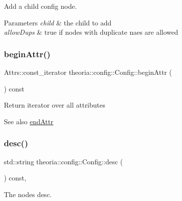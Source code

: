 Add a child config node. 
\begin{DoxyParams}{Parameters}
{\em child} & the child to add \\
\hline
{\em allow\+Dups} & true if nodes with duplicate naes are allowed \\
\hline
\end{DoxyParams}
\mbox{\label{classtheoria_1_1config_1_1Config_a4bd7712d99a507b1da47da9257094051}} 
\subsubsection{\texorpdfstring{begin\+Attr()}{beginAttr()}}
{\footnotesize\ttfamily Attrs\+::const\+\_\+iterator theoria\+::config\+::\+Config\+::begin\+Attr (\begin{DoxyParamCaption}{ }\end{DoxyParamCaption}) const\hspace{0.3cm}{\ttfamily [inline]}}

Return iterator over all attributes \begin{DoxySeeAlso}{See also}
\hyperlink{classtheoria_1_1config_1_1Config_a3d4ea72c3b43c8674456fdc263d39e39}{end\+Attr} 
\end{DoxySeeAlso}
\mbox{\label{classtheoria_1_1config_1_1Config_a4d6b2e26d1139819769eaf6bb959b034}} 
\subsubsection{\texorpdfstring{desc()}{desc()}}
{\footnotesize\ttfamily std\+::string theoria\+::config\+::\+Config\+::desc (\begin{DoxyParamCaption}{ }\end{DoxyParamCaption}) const\hspace{0.3cm}{\ttfamily [inline]}, {\ttfamily [noexcept]}}

The nodes desc. \mbox{\label{classtheoria_1_1config_1_1Config_a3d4ea72c3b43c8674456fdc263d39e39}} 
